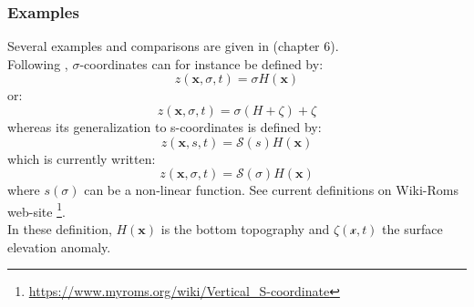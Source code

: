 \subsubsection{Examples}
Several examples and comparisons are given in \cite{griffies_fundamentals_2004} (chapter 6).\\
Following  \citep{shchepetkin_regional_2005},  $\sigma$-coordinates can for instance be defined by:
\begin{equation}
 \displaystyle
 z(\mathbf{x},\sigma,t)=\sigma H(\mathbf{x})
\end{equation}
or:
\begin{equation}
 \displaystyle
 z(\mathbf{x},\sigma,t)=\sigma(H+\zeta)+\zeta
\end{equation}
whereas its generalization to s-coordinates is defined by:
\begin{equation}
 \displaystyle
 z(\mathbf{x},s,t)=\mathcal{S}(s) H(\mathbf{x})
\end{equation}
which is currently written:
\begin{equation}
 \displaystyle
 z(\mathbf{x},\sigma,t)=\mathcal{S}(\sigma) H(\mathbf{x})
\end{equation}
where $s(\sigma)$ can be a non-linear function. See current definitions on Wiki-Roms web-site \footnote{\url{https://www.myroms.org/wiki/Vertical_S-coordinate}}.\\

In these definition, $H(\mathbf{x})$ is the bottom topography and $\zeta(\mathcal{x},t)$ the surface elevation anomaly.


